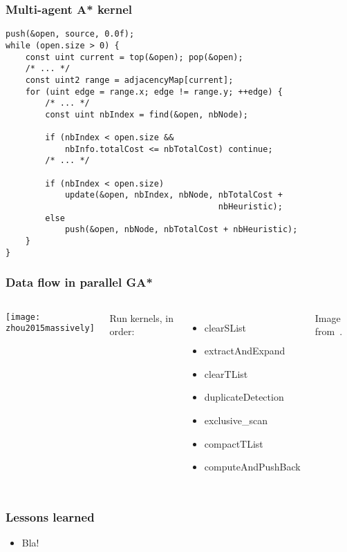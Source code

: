 \documentclass{beamer}
\begin{document}
\begin{frame}[fragile]
    \frametitle{Multi-agent A* kernel}
    \begin{lstlisting}
push(&open, source, 0.0f);
while (open.size > 0) {
    const uint current = top(&open); pop(&open);
    /* ... */
    const uint2 range = adjacencyMap[current];
    for (uint edge = range.x; edge != range.y; ++edge) {
        /* ... */
        const uint nbIndex = find(&open, nbNode);

        if (nbIndex < open.size &&
            nbInfo.totalCost <= nbTotalCost) continue;
        /* ... */

        if (nbIndex < open.size)
            update(&open, nbIndex, nbNode, nbTotalCost +
                                           nbHeuristic);
        else
            push(&open, nbNode, nbTotalCost + nbHeuristic);
    }
}
    \end{lstlisting}
\end{frame}

\begin{frame}
    \frametitle{Data flow in parallel GA*}
    \begin{columns}
        \texttt{[image: zhou2015massively]}
        
        Run kernels, in order:
        \begin{itemize}
            \item clearSList
            \item extractAndExpand
            \item clearTList
            \item duplicateDetection
            \item exclusive\_scan
            \item compactTList
            \item computeAndPushBack
        \end{itemize}
        
        \vspace{1em}
        Image from~\cite{zhou2015massively}.
    \end{columns}
\end{frame}

\begin{frame}
    \frametitle{Lessons learned}
    \begin{itemize}
        \item Bla!
    \end{itemize}
\end{frame}
\end{document}
